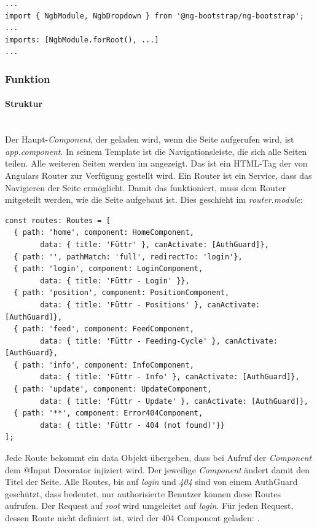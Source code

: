 \begin{lstlisting}[caption=app.module (Auszug) Importieren von ng-bootstrap,label=import-ng-bootstrap,style=TS]
...
import { NgbModule, NgbDropdown } from '@ng-bootstrap/ng-bootstrap';
...
imports: [NgbModule.forRoot(), ...]
...
\end{lstlisting}


\subsubsection{Funktion}
\label{sec:ums-client-funktion}

\paragraph*{Struktur} \mbox {}\\
Der Haupt-\textit{Component}, der geladen wird, wenn die Seite aufgerufen wird, ist \textit{app.component}. In seinem Template ist die Navigationsleiste, die sich alle Seiten teilen. Alle weiteren Seiten werden im  angezeigt. Das ist ein \ac{HTML}-Tag der von Angulars Router zur Verfügung gestellt wird. Ein Router ist ein Service, dass das Navigieren der Seite ermöglicht. Damit das funktioniert, muss dem Router mitgeteilt werden, wie die Seite aufgebaut ist. Dies geschieht im \textit{router.module}:

\begin{lstlisting}[caption=Routes Definition,style=TS]
const routes: Routes = [
  { path: 'home', component: HomeComponent, 
  		data: { title: 'Füttr' }, canActivate: [AuthGuard]},
  { path: '', pathMatch: 'full', redirectTo: 'login'},
  { path: 'login', component: LoginComponent,
  		data: { title: 'Füttr - Login' }},
  { path: 'position', component: PositionComponent, 
  		data: { title: 'Füttr - Positions' }, canActivate: [AuthGuard]},
  { path: 'feed', component: FeedComponent, 
  		data: { title: 'Füttr - Feeding-Cycle' }, canActivate: [AuthGuard},
  { path: 'info', component: InfoComponent, 
  		data: { title: 'Füttr - Info' }, canActivate: [AuthGuard]},
  { path: 'update', component: UpdateComponent, 
  		data: { title: 'Füttr - Update' }, canActivate: [AuthGuard]},
  { path: '**', component: Error404Component, 
  		data: { title: 'Füttr - 404 (not found)'}}
];
\end{lstlisting}

Jede Route bekommt ein data Objekt übergeben, dass bei Aufruf der \textit{Component} dem @Input Decorator injiziert wird. Der jeweilige \textit{Component} ändert damit den Titel der Seite. Alle Routes, bis auf \textit{login} und \textit{404} sind von einem AuthGuard geschützt, dass bedeutet, nur authorisierte Benutzer können diese Routes aufrufen. Der Request auf \textit{root}  wird umgeleitet auf \textit{login}. Für jeden Request, dessen Route nicht definiert ist, wird der 404 Component geladen: .


